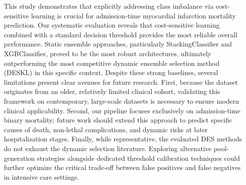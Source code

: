 \documentclass[conference]{IEEEtran}
\begin{document}
This study demonstrates that explicitly addressing class imbalance via cost-sensitive learning is crucial for admission-time myocardial infarction mortality prediction. Our systematic evaluation reveals that cost-sensitive learning combined with a standard decision threshold provides the most reliable overall performance. Static ensemble approaches, particularly StackingClassifier and XGBClassifier, proved to be the most robust architectures, ultimately outperforming the most competitive dynamic ensemble selection method (DESKL) in this specific context. Despite these strong baselines, several limitations present clear avenues for future research. First, because the dataset originates from an older, relatively limited clinical cohort, validating this framework on contemporary, large-scale datasets is necessary to ensure modern clinical applicability. Second, our pipeline focuses exclusively on admission-time binary mortality; future work should extend this approach to predict specific causes of death, non-lethal complications, and dynamic risks at later hospitalization stages. Finally, while representative, the evaluated DES methods do not exhaust the dynamic selection literature. Exploring alternative pool-generation strategies alongside dedicated threshold calibration techniques could further optimize the critical trade-off between false positives and false negatives in intensive care settings.



\end{document}
